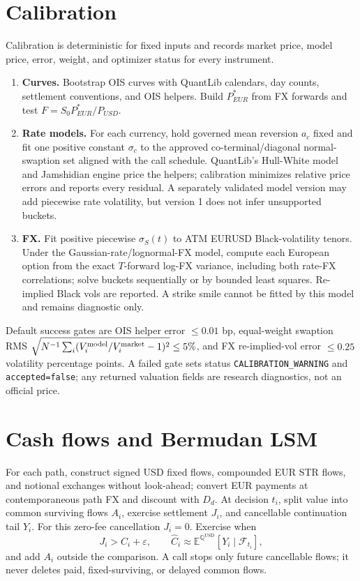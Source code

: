 \documentclass[conference]{IEEEtran}
\newcommand{\Qd}{\mathbb{Q}^{\mathrm{USD}}}
\newcommand{\E}{\mathbb{E}}
\begin{document}
\section{Calibration}

Calibration is deterministic for fixed inputs and records market price, model price, error, weight, and optimizer status for every instrument.

\begin{enumerate}
 \item \textbf{Curves.} Bootstrap OIS curves with QuantLib calendars, day counts, settlement conventions, and OIS helpers. Build $P_{EUR}^{*}$ from FX forwards and test $F=S_0P_{EUR}^{*}/P_{USD}$.
 \item \textbf{Rate models.} For each currency, hold governed mean reversion $a_c$ fixed and fit one positive constant $\sigma_c$ to the approved co-terminal/diagonal normal-swaption set aligned with the call schedule. QuantLib's Hull-White model and Jamshidian engine price the helpers; calibration minimizes relative price errors and reports every residual. A separately validated model version may add piecewise rate volatility, but version 1 does not infer unsupported buckets.
 \item \textbf{FX.} Fit positive piecewise $\sigma_S(t)$ to ATM EURUSD Black-volatility tenors. Under the Gaussian-rate/lognormal-FX model, compute each European option from the exact $T$-forward log-FX variance, including both rate-FX correlations; solve buckets sequentially or by bounded least squares. Re-implied Black vols are reported. A strike smile cannot be fitted by this model and remains diagnostic only.
\end{enumerate}

Default success gates are OIS helper error $\leq0.01$ bp, equal-weight swaption RMS $\sqrt{N^{-1}\sum_i(V_i^{\rm model}/V_i^{\rm market}-1)^2}\leq5\%$, and FX re-implied-vol error $\leq0.25$ volatility percentage points. A failed gate sets status \texttt{CALIBRATION\_WARNING} and \texttt{accepted=false}; any returned valuation fields are research diagnostics, not an official price.

\section{Cash flows and Bermudan LSM}

For each path, construct signed USD fixed flows, compounded EUR \texteuro STR flows, and notional exchanges without look-ahead; convert EUR payments at contemporaneous path FX and discount with $D_d$. At decision $t_i$, split value into common surviving flows $A_i$, exercise settlement $J_i$, and cancellable continuation tail $Y_i$. For this zero-fee cancellation $J_i=0$. Exercise when
\[
 J_i>\widehat C_i+\varepsilon,\qquad
 \widehat C_i\approx\E^{\Qd}[Y_i\mid\mathcal F_{t_i}],
\]
and add $A_i$ outside the comparison. A call stops only future cancellable flows; it never deletes paid, fixed-surviving, or delayed common flows.
\end{document}
